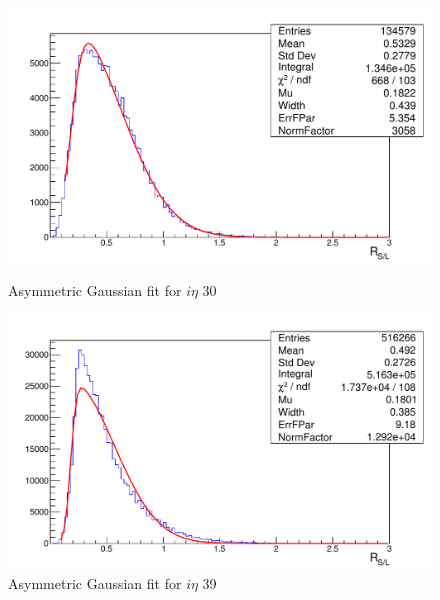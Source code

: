 \begin{itemize}
\begin{figure}[ht]
\begin{minipage}[b]{0.45\linewidth}
\centering
\includegraphics[width=\textwidth]{../Figures/Chap2/ImageFiles_HF/Ratio/RatioietaP30.pdf}
\captionsetup{width=.9\linewidth}
\caption{Asymmetric Gaussian fit for $i \eta$ 30}
\label{goodfit}
\end{minipage}
\hspace{0.5cm}
\begin{minipage}[b]{0.45\linewidth}
\centering
\includegraphics[width=\textwidth]{../Figures/Chap2/ImageFiles_HF/Ratio/RatioietaP39.pdf}
\captionsetup{width=.9\linewidth}
\caption{Asymmetric Gaussian fit for $i \eta$ 39}
\label{badfit}
\end{minipage}
\end{figure}


\end{itemize}
